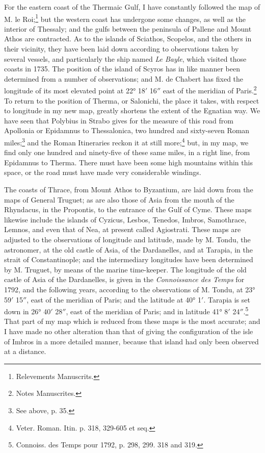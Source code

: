 \documentclass[a4paper, 11pt, oneside, polutonikogreek, english]{article}
\begin{document}
For the eastern coast of the Thermaic Gulf, I have constantly followed the map of M. le Roi;\footnote{Relevements Manuscrits.} but the western coast has undergone some changes, as well as the interior of Thessaly; and the gulfs between the peninsula of Pallene and Mount Athos are contracted. As to the islands of Sciathos, Scopelos, and the others in their vicinity, they have been laid down according to observations taken by several vessels, and particularly the ship named \emph{Le Bayle}, which visited those coasts in 1735. The position of the island of Scyros has in like manner been determined from a number of observations; and M. de Chabert has fixed the longitude of its most elevated point at 22° 18$'$ 16$''$ east of the meridian of Paris.\footnote{Notes Manuscrites.} To return to the position of Therma, or Salonichi, the place it takes, with respect to longitude in my new map, greatly shortens the extent of the Egnatian way. We have seen that Polybius in Strabo gives for the measure of this road from Apollonia or Epidamnus to Thessalonica, two hundred and sixty-seven Roman miles;\footnote{See above, p. 35.} and the Roman Itineraries reckon it at still more;\footnote{Veter. Roman. Itin. p. 318, 329-605 et seq.} but, in my map, we find only one hundred and ninety-five of these same miles, in a right line, from Epidamnus to Therma. There must have been some high mountains within this space, or the road must have made very considerable windings.

The coasts of Thrace, from Mount Athos to Byzantium, are laid down from the maps of General Truguet; as are also those of Asia from the mouth of the Rhyndacus, in the Propontis, to the entrance of the Gulf of Cyme. These maps likewise include the islands of Cyzicus, Lesbos, Tenedos, Imbros, Samothrace, Lemnos, and even that of Nea, at present called Agiostrati. These maps are adjusted to the observations of longitude and latitude, made by M. Tondu, the astronomer, at the old castle of Asia, of the Dardanelles, and at Tarapia, in the strait of Constantinople; and the intermediary longitudes have been determined by M. Truguet, by means of the marine time-keeper. The longitude of the old castle of Asia of the Dardanelles, is given in the \emph{Connoissance des Temps} for 1792, and the following years, according to the observations of M. Tondu, at 23° 59$'$ 15$''$, east of the meridian of Paris; and the latitude at 40° 1$'$. Tarapia is set down in 26° 40$'$ 28$''$, east of the meridian of Paris; and in latitude 41° 8$'$ 24$''$.\footnote{Connoiss. des Temps pour 1792, p. 298, 299. 318 and 319.} That part of my map which is reduced from these maps is the most accurate; and I have made no other alteration than that of giving the configuration of the isle of Imbros in a more detailed manner, because that island had only been observed at a distance.
\end{document}
